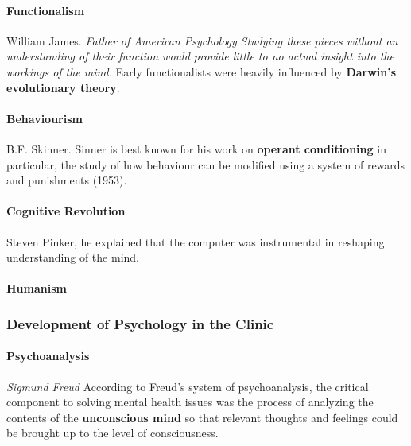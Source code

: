 \documentclass{article}
\begin{document}
 	\paragraph{Functionalism} William James.
 		\newline \emph{Father of American Psychology}
 		\newline \emph{Studying these pieces without an understanding of their function would provide little to no actual insight into the workings of the mind.}
 		\newline Early functionalists were heavily influenced by \textbf{Darwin's evolutionary theory}.
 	\paragraph{Behaviourism} B.F. Skinner.
 	\newline Sinner is best known for his work on \textbf{operant conditioning} in particular, the study of how behaviour can be modified using a system of rewards and punishments (1953).
 	\paragraph{Cognitive Revolution} Steven Pinker, he explained that the computer was instrumental in reshaping understanding of the mind.
 	\paragraph{Humanism}
 	\subsubsection{Development of Psychology in the Clinic}
 	\paragraph{Psychoanalysis} \emph{Sigmund Freud}
 		\newline According to Freud's system of psychoanalysis, the critical component to solving mental health issues was the process of analyzing the contents of the \textbf{unconscious mind} so that relevant thoughts and feelings could be brought up to the level of consciousness.
\end{document}
